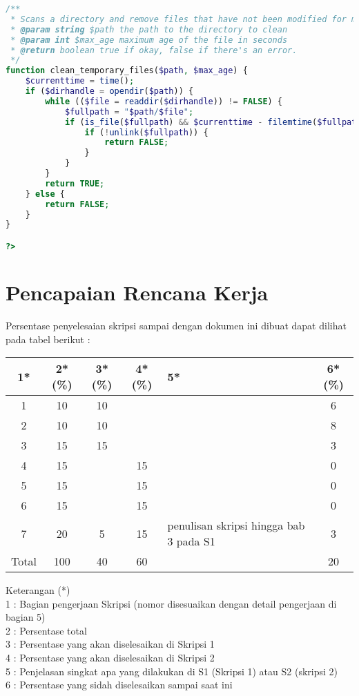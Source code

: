 \documentclass[a4paper,twoside]{article}
\begin{document}
\begin{lstlisting}[language=PHP,basicstyle=\tiny,caption=handle.php,label={lst:handle.php}]
/**
 * Scans a directory and remove files that have not been modified for max_age
 * @param string $path the path to the directory to clean 
 * @param int $max_age maximum age of the file in seconds
 * @return boolean true if okay, false if there's an error.
 */
function clean_temporary_files($path, $max_age) {
	$currenttime = time();
	if ($dirhandle = opendir($path)) {
		while (($file = readdir($dirhandle)) != FALSE) {
			$fullpath = "$path/$file";
			if (is_file($fullpath) && $currenttime - filemtime($fullpath) > $max_age) {
				if (!unlink($fullpath)) {
					return FALSE;
				}
			}
		}
		return TRUE;
	} else {
		return FALSE;
	}
}

?>
\end{lstlisting}

\section{Pencapaian Rencana Kerja}
Persentase penyelesaian skripsi sampai dengan dokumen ini dibuat dapat dilihat pada tabel berikut :




\begin{center}
  \begin{tabular}{ | c | c | c | c | l | c |}
    \hline
    1*  & 2*(\%) & 3*(\%) & 4*(\%) &5* &6*(\%)\\ \hline \hline
    1   & 10 & 10 &    &  & 6 \\ \hline
    2   & 10 & 10 &    &  & 8 \\ \hline
    3   & 15 & 15 &    &  & 3 \\ \hline
    4   & 15 &    & 15 &  & 0 \\ \hline
    5   & 15 &    & 15 &  & 0 \\ \hline
    6   & 15 &    & 15 &  & 0 \\ \hline
    7   & 20 & 5  & 15 & {\footnotesize penulisan skripsi hingga bab 3 pada S1} & 3 \\ \hline
    Total  & 100  & 40  & 60 &  & 20\\ \hline
                          \end{tabular}
\end{center}

Keterangan (*)\\
1 : Bagian pengerjaan Skripsi (nomor disesuaikan dengan detail pengerjaan di bagian 5)\\
2 : Persentase total \\
3 : Persentase yang akan diselesaikan di Skripsi 1 \\
4 : Persentase yang akan diselesaikan di Skripsi 2 \\
5 : Penjelasan singkat apa yang dilakukan di S1 (Skripsi 1) atau S2 (skripsi 2)\\
6 : Persentase yang sidah diselesaikan sampai saat ini 
\end{document}
